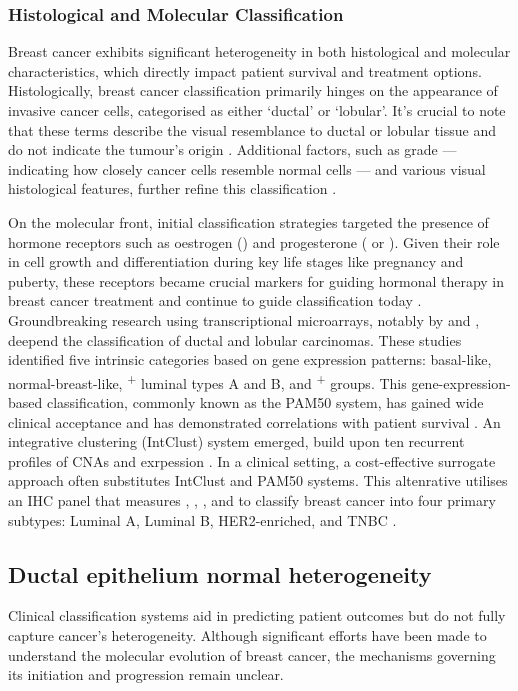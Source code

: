 \subsubsection{Histological and Molecular Classification}
Breast cancer exhibits significant heterogeneity in both histological and molecular characteristics, which directly impact patient survival and treatment options. Histologically, breast cancer classification primarily hinges on the appearance of invasive cancer cells, categorised as either `ductal' or  `lobular'. It's crucial to note that these terms describe the visual resemblance to ductal or lobular tissue and do not indicate the tumour's origin  \parencite{Tabar2022-iq}. Additional factors, such as grade — indicating how closely cancer cells resemble normal cells — and various visual histological features, further refine this classification \parencite{Elston1991-md}.

On the molecular front, initial classification strategies targeted the presence of hormone receptors such as oestrogen () and progesterone ( or ). Given their role in cell growth and differentiation during key life stages like pregnancy and puberty, these receptors became crucial markers for guiding hormonal therapy in breast cancer treatment and continue to guide classification today \parencite{Early_breast_cancer_trialists_collaborative_group1992-dy}. Groundbreaking research using transcriptional microarrays, notably by \textcite{Perou2000-hc} and \textcite{Sorlie2001-yy}, deepend the classification of ductal and lobular carcinomas. These studies identified five intrinsic categories based on gene expression patterns: basal-like, normal-breast-like, \textsuperscript{+} luminal types A and B, and \textsuperscript{+} groups. This gene-expression-based classification, commonly known as the PAM50 system, has gained wide clinical acceptance and has demonstrated correlations with patient survival \parencite{Wallden2015-bp}. An integrative clustering (IntClust) system emerged, build upon ten recurrent profiles of \acp{CNA} and exrpession \parencite{Curtis2012-hu}. In a clinical setting, a cost-effective surrogate approach often substitutes IntClust and PAM50 systems. This altenrative utilises an \ac{IHC} panel that measures , , , and  to classify breast cancer into four primary subtypes: Luminal A, Luminal B, HER2-enriched, and \ac{TNBC} \parencite{Goldhirsch2013-xy}. 

\subsection{Ductal epithelium normal heterogeneity}
Clinical classification systems aid in predicting patient outcomes but do not fully capture cancer's heterogeneity. Although significant efforts have been made to understand the molecular evolution of breast cancer, the mechanisms governing its initiation and progression remain unclear.

